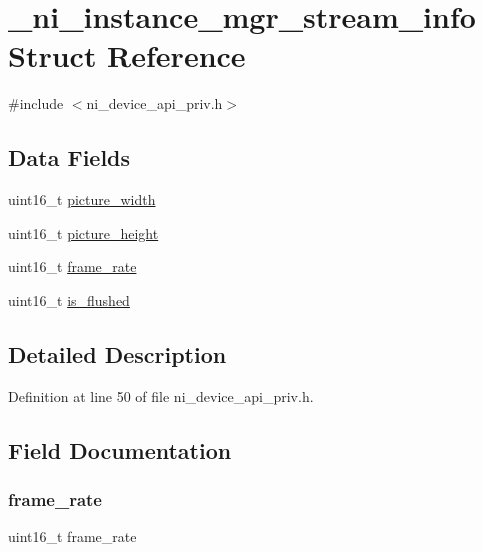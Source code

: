 \hypertarget{struct__ni__instance__mgr__stream__info}{}\section{\+\_\+ni\+\_\+instance\+\_\+mgr\+\_\+stream\+\_\+info Struct Reference}
\label{struct__ni__instance__mgr__stream__info}


{\ttfamily \#include $<$ni\+\_\+device\+\_\+api\+\_\+priv.\+h$>$}

\subsection*{Data Fields}
\begin{DoxyCompactItemize}
\item 
uint16\+\_\+t \mbox{\hyperlink{struct__ni__instance__mgr__stream__info_ae92adc42ff99cfbf1d1eae8b13d7bd75}{picture\+\_\+width}}
\item 
uint16\+\_\+t \mbox{\hyperlink{struct__ni__instance__mgr__stream__info_a6bd8a255766c1b1b0c3cc01169b673a1}{picture\+\_\+height}}
\item 
uint16\+\_\+t \mbox{\hyperlink{struct__ni__instance__mgr__stream__info_a5cbd910f7c047f675e5022a0fedbfb88}{frame\+\_\+rate}}
\item 
uint16\+\_\+t \mbox{\hyperlink{struct__ni__instance__mgr__stream__info_a53f8d848132d487dcb862de1e6ccbac7}{is\+\_\+flushed}}
\end{DoxyCompactItemize}


\subsection{Detailed Description}


Definition at line 50 of file ni\+\_\+device\+\_\+api\+\_\+priv.\+h.



\subsection{Field Documentation}
\mbox{\label{struct__ni__instance__mgr__stream__info_a5cbd910f7c047f675e5022a0fedbfb88}} 
\subsubsection{\texorpdfstring{frame\_rate}{frame\_rate}}
{\footnotesize\ttfamily uint16\+\_\+t frame\+\_\+rate}



